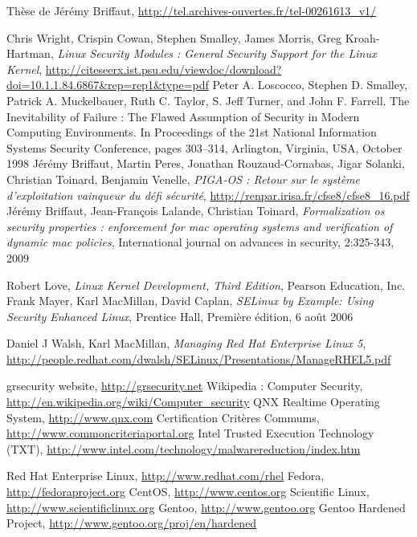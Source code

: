 \documentclass[pdftex,a4paper,titlepage,11pt]{article}
\begin{document}
\newpage


\begin{thebibliography}{40}

 Thèse de Jérémy Briffaut, \url{http://tel.archives-ouvertes.fr/tel-00261613_v1/}

 Chris Wright, Crispin Cowan, Stephen Smalley, James Morris, Greg Kroah-Hartman, \textit{Linux Security Modules : General Security Support for the Linux Kernel}, \url{http://citeseerx.ist.psu.edu/viewdoc/download?doi=10.1.1.84.6867&rep=rep1&type=pdf}
 Peter A. Loscocco, Stephen D. Smalley, Patrick A. Muckelbauer, Ruth C. Taylor, S. Jeff Turner, and John F. Farrell. The Inevitability of Failure : The Flawed Assumption of Security in Modern Computing Environments. In Proceedings of the 21st National Information Systems Security Conference, pages 303–314, Arlington, Virginia, USA, October 1998
 Jérémy Briffaut, Martin Peres, Jonathan Rouzaud-Cornabas, Jigar Solanki, Christian Toinard, Benjamin Venelle, \textit{PIGA-OS : Retour sur le système d'exploitation vainqueur du défi sécurité}, \url{http://renpar.irisa.fr/cfse8/cfse8_16.pdf}
 Jérémy Briffaut, Jean-François Lalande, Christian Toinard, \textit{Formalization os security properties : enforcement for mac operating systems and verification of dynamic mac policies}, International journal on advances in security, 2:325-343, 2009

 Robert Love, \textit{Linux Kernel Development, Third Edition}, Pearson Education, Inc.
 Frank Mayer, Karl MacMillan, David Caplan, \textit{SELinux by Example: Using Security Enhanced Linux}, Prentice Hall, Première édition, 6 août 2006

 Daniel J Walsh, Karl MacMillan, \textit{Managing Red Hat Enterprise Linux 5}, \url{http://people.redhat.com/dwalsh/SELinux/Presentations/ManageRHEL5.pdf}

 grsecurity website, \url{http://grsecurity.net}
 Wikipedia : Computer Security, \url{http://en.wikipedia.org/wiki/Computer_security}
 QNX Realtime Operating System, \url{http://www.qnx.com}
 Certification Critères Commums, \url{http://www.commoncriteriaportal.org}
 Intel Trusted Execution Technology (TXT), \url{http://www.intel.com/technology/malwarereduction/index.htm}

 Red Hat Enterprise Linux, \url{http://www.redhat.com/rhel}
 Fedora, \url{http://fedoraproject.org}
 CentOS, \url{http://www.centos.org}
 Scientific Linux, \url{http://www.scientificlinux.org}
 Gentoo, \url{http://www.gentoo.org}
 Gentoo Hardened Project, \url{http://www.gentoo.org/proj/en/hardened}

\end{thebibliography}
\end{document}

